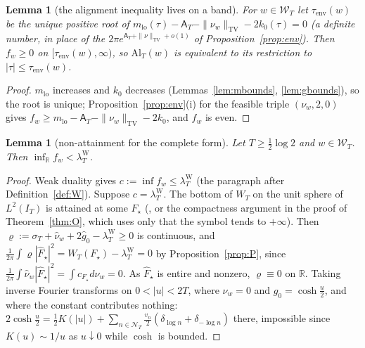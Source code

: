 \documentclass[11pt]{amsart}
\newtheorem{lemma}[theorem]{Lemma}
\theoremstyle{definition}
\theoremstyle{remark}
\newcommand{\R}{\mathbb R}
\newcommand{\TV}{\operatorname{TV}}
\newcommand{\IT}{I_T}
\newcommand{\lamW}{\lambda^{\mathrm W}_T}
\newcommand{\sT}{\sigma_T}
\newcommand{\gh}[1]{\widehat g_{#1}}
\newcommand{\nuh}{\widehat\nu}
\newcommand{\Fh}{\widehat F}
\newcommand{\Wcl}{\mathcal W_T}
\newcommand{\NT}{\mathcal N_T}
\newcommand{\Aconst}{\mathsf A_T}
\begin{document}
\begin{lemma}[the alignment inequality lives on a band]\label{lem:Alband}
For $w\in\Wcl$ let $\tau_{\mathrm{env}}(w)$ be the unique positive root of
$m_{\mathrm{lo}}(\tau)-\Aconst-\|\nu_w\|_{\TV}-2k_0(\tau)=0$ (a definite number, in place of the
$2\pi e^{\Aconst+\|\nu\|_{\TV}+o(1)}$ of Proposition~\ref{prop:env}). Then $f_w\ge0$ on $[\tau_{\mathrm{env}}(w),\infty)$,
so $\mathrm{Al}_T(w)$ is equivalent to its restriction to $|\tau|\le\tau_{\mathrm{env}}(w)$.
\end{lemma}
\begin{proof}
$m_{\mathrm{lo}}$ increases and $k_0$ decreases (Lemmas~\ref{lem:mbounds}, \ref{lem:gbounds}), so the root is
unique; Proposition~\ref{prop:env}(i) for the feasible triple $(\nu_w,2,0)$ gives
$f_w\ge m_{\mathrm{lo}}-\Aconst-\|\nu_w\|_{\TV}-2k_0$, and $f_w$ is even.
\end{proof}

\begin{lemma}[non-attainment for the complete form]\label{lem:Onat}
Let $T\ge\frac12\log2$ and $w\in\Wcl$. Then $\inf_\R f_w<\lamW$.
\end{lemma}
\begin{proof}
Weak duality gives $c:=\inf f_w\le\lamW$ (the paragraph after Definition~\ref{def:W}). Suppose $c=\lamW$. The
bottom of $W_T$ on the unit sphere of $L^2(\IT)$ is attained at some $F_\star$ (\cite[Thm.~3]{Bombieri2000},
or the compactness argument in the proof of Theorem~\ref{thm:O}, which uses only that the symbol tends to
$+\infty$). Then $\varrho:=\sT+\nuh_w+2\gh0-\lamW\ge0$ is continuous, and
$\frac1{2\pi}\int\varrho|\Fh_\star|^2=W_T(F_\star)-\lamW=0$ by Proposition~\ref{prop:P}, since
$\frac1{2\pi}\int\nuh_w|\Fh_\star|^2=\int c_{F_\star}d\nu_w=0$. As $\Fh_\star$ is entire and nonzero,
$\varrho\equiv0$ on $\R$. Taking inverse Fourier transforms on $0<|u|<2T$, where $\nu_w=0$ and $g_0=\cosh\frac u2$,
and where the constant contributes nothing: $2\cosh\frac u2=\frac12K(|u|)+\sum_{n\in\NT}\frac{v_n}2(\delta_{\log n}+\delta_{-\log n})$
there, impossible since $K(u)\sim1/u$ as $u\downarrow0$ while $\cosh$ is bounded.
\end{proof}
\end{document}
